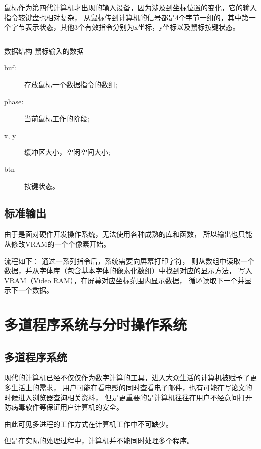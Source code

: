 鼠标作为第四代计算机才出现的输入设备，因为涉及到坐标位置的变化，它的输入指令较键盘也相对复杂，
从鼠标传到计算机的信号都是4个字节一组的，其中第一个字节表示状态，其他3个有效指令分别为x坐标，y坐标以及鼠标按键状态。

\begin{listing}[H]
  \inputminted[tabsize=2, firstline=126, lastline=129,
    linenos=true]{c}{../ZOS/src/kernel/bootpack.h}
  \caption{数据结构-鼠标输入的数据}
  \label{lst:mouse_data}
\end{listing}
\begin{description}
\item[buf:]存放鼠标一个数据指令的数组;
\item[phase:]当前鼠标工作的阶段;
\item[x, y]缓冲区大小，空闲空间大小;
\item[btn]按键状态。
\end{description}


\subsection{标准输出}

由于是面对硬件开发操作系统，无法使用各种成熟的库和函数，
所以输出也只能从修改VRAM的一个个像素开始。

流程如下：
通过一系列指令后，系统需要向屏幕打印字符，
则从数组中读取一个数据，并从字体库（包含基本字体的像素化数组）中找到对应的显示方法，
写入VRAM（Video RAM），在屏幕对应坐标范围内显示数据，
循环读取下一个并显示下一个数据。

\section{多道程序系统与分时操作系统}

\subsection{多道程序系统}

现代的计算机已经不仅仅作为数字计算的工具，进入大众生活的计算机被赋予了更多生活上的需求，
用户可能在看电影的同时查看电子邮件，也有可能在写论文的时候进入浏览器查询相关资料，
但是更重要的是计算机往往在用户不经意间打开防病毒软件等保证用户计算机的安全。

由此可见多进程的工作方式在计算机工作中不可缺少。

但是在实际的处理过程中，计算机并不能同时处理多个程序。


